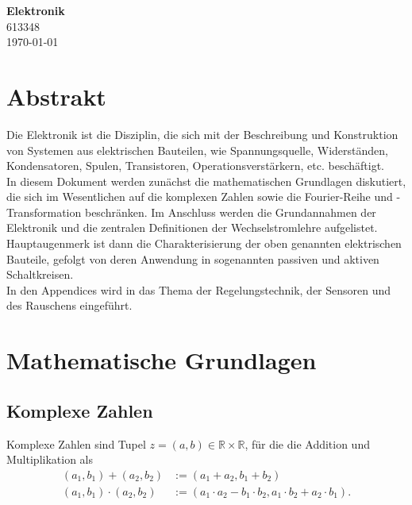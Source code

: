 \documentclass{article}
\begin{document}
\begin{center}
	\Large{\textbf{Elektronik}}\\
	\small{613348}\\
	\small{\today}
\end{center}


\tableofcontents


\newpage


\section*{Abstrakt}
Die Elektronik ist die Disziplin, die sich mit der Beschreibung und Konstruktion von Systemen aus elektrischen Bauteilen, wie Spannungsquelle, Widerständen, Kondensatoren, Spulen, Transistoren, Operationsverstärkern, etc. beschäftigt.\\
In diesem Dokument werden zunächst die mathematischen Grundlagen diskutiert, die sich im Wesentlichen auf die komplexen Zahlen sowie die Fourier-Reihe und -Transformation beschränken. Im Anschluss werden die Grundannahmen der Elektronik und die zentralen Definitionen der Wechselstromlehre aufgelistet. Hauptaugenmerk ist dann die Charakterisierung der oben genannten elektrischen Bauteile, gefolgt von deren Anwendung in sogenannten passiven und aktiven Schaltkreisen. \\
In den Appendices wird in das Thema der Regelungstechnik, der Sensoren und des Rauschens eingeführt.


\newpage


\section{Mathematische Grundlagen}
\subsection{Komplexe Zahlen}
Komplexe Zahlen sind Tupel $z = (a,b) \in \mathbb{R} \times \mathbb{R}$, für die die Addition und Multiplikation als
	\begin{align}
		(a_1, b_1) + (a_2, b_2) &:= (a_1 + a_2, b_1 + b_2) \\
		(a_1, b_1) \cdot (a_2, b_2) &:= (a_1 \cdot a_2 - b_1 \cdot b_2, a_1 \cdot b_2 + a_2 \cdot b_1).
	\end{align}
\end{document}
